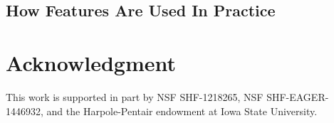 \documentclass[conference]{IEEEtran}
\begin{document}
\subsection{How Features Are Used In Practice}

\section*{Acknowledgment}
This work is supported in part by NSF SHF-1218265, NSF SHF-EAGER-1446932, and the Harpole-Pentair endowment at Iowa State University.






\balance


\end{document}
